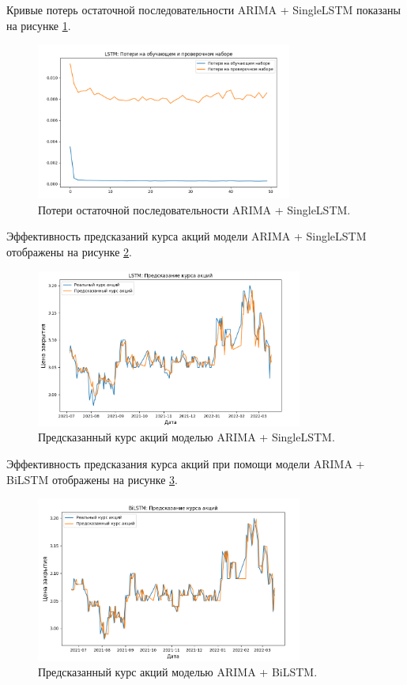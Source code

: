\par Кривые потерь остаточной последовательности ARIMA + SingleLSTM показаны на рисунке \ref{fig:lstm-train-val-loss}.

\begin{figure}[hbtp]
  \centering
  \includegraphics[width=0.75\textwidth]{img/lstm_train_val_loss.png}
  \caption{Потери остаточной последовательности ARIMA + SingleLSTM.}
  \label{fig:lstm-train-val-loss}
\end{figure}

\newpage
\par Эффективность предсказаний курса акций модели ARIMA + SingleLSTM отображены на рисунке \ref{fig:lstm}.

\begin{figure}[hbtp]
  \centering
  \includegraphics[width=0.78\textwidth]{img/lstm.png}
  \caption{Предсказанный курс акций моделью ARIMA + SingleLSTM.}
  \label{fig:lstm}
\end{figure}

\par Эффективность предсказания курса акций при помощи модели ARIMA + BiLSTM отображены на рисунке \ref{fig:bilstm}.

\begin{figure}[hbtp]
  \centering
  \includegraphics[width=0.78\textwidth]{img/bilstm.png}
  \caption{Предсказанный курс акций моделью ARIMA + BiLSTM.}
  \label{fig:bilstm}
\end{figure}

